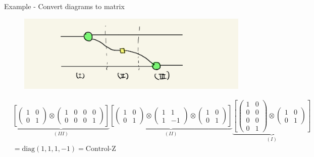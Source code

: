 \documentclass[aspectratio=169,xcolor=dvipsnames, t]{beamer}
\begin{document}
\begin{frame}{Example - Convert diagrams to matrix}
    \begin{figure}
        \includegraphics[width=.6\textwidth]{figures/zx_cz_to_matrix.PNG}
    \end{figure}
    \begin{align*}
        &\underbrace{\left[\begin{pmatrix}
            1 & 0\\
            0 & 1
        \end{pmatrix}\otimes \begin{pmatrix}
            1 & 0 & 0 & 0\\
            0 & 0 & 0 & 1
        \end{pmatrix}\right]}_{(III)}\underbrace{\left[\begin{pmatrix}
            1 & 0 \\
            0 & 1
        \end{pmatrix} \otimes \begin{pmatrix}
            1 & 1 \\
            1 & -1
        \end{pmatrix} \otimes \begin{pmatrix}
            1 & 0 \\
            0 & 1
        \end{pmatrix}\right]}_{(II)}\underbrace{\left[\begin{pmatrix}
            1 & 0\\
            0 & 0\\
            0 & 0\\
            0 & 1
        \end{pmatrix} \otimes \begin{pmatrix}
            1 & 0\\
            0 & 1
        \end{pmatrix} \right]}_{(I)} \\
        &= \text{diag}(1,1,1,-1) = \text{Control-Z}
    \end{align*}


 \end{frame}
\end{document}
